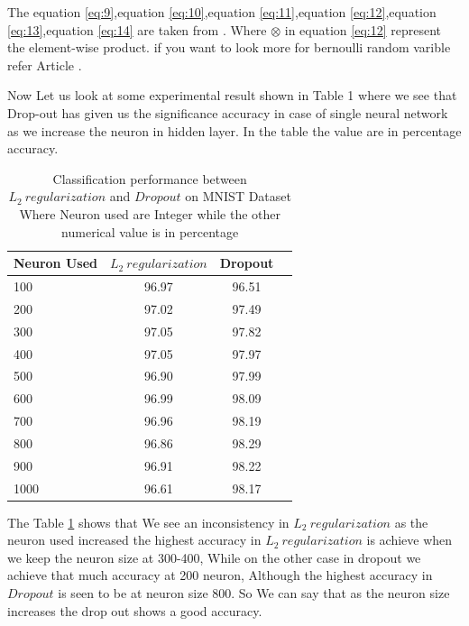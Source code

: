 \documentclass{article}
\begin{document}
\begin{multicols}{2}
The equation \ref{eq:9},equation \ref{eq:10},equation \ref{eq:11},equation \ref{eq:12},equation \ref{eq:13},equation \ref{eq:14} are taken from \cite{7877209}. Where $\otimes$ in equation \ref{eq:12} represent the element-wise product. if you want to look more for bernoulli random varible refer Article \cite{https://doi.org/10.1002/bimj.201500115}. 

Now Let us look at some experimental result shown in Table 1 where we see that Drop-out has given us the significance accuracy in case of single neural network as we increase the neuron in hidden layer. In the table the value are in percentage accuracy. 

\begin{table}[H]
    \centering
    \begin{tabular}{|p{2 cm}|c|c|c|}
    \hline
    \centering Neuron Used & 
         \centering $L_2 \ regularization$
         & Dropout \\
    \hline
    100
    &  96.97
    &  96.51 \\
    200
    &  97.02
    &  97.49 \\
    300
    &  97.05
    &  97.82 \\
    400
    &  97.05
    &  97.97 \\
    500
    &  96.90
    &  97.99 \\
    600
    &  96.99
    &  98.09 \\
    700
    &  96.96
    &  98.19 \\
    800
    &  96.86
    &  98.29 \\
    900
    &  96.91
    &  98.22 \\
    1000
    &  96.61
    &  98.17 \\
    \hline
    
    \end{tabular}
    \caption{Classification performance between $L_2 \ regularization$ and $Dropout$ on MNIST Dataset Where Neuron used are Integer while the other numerical value is in percentage\cite{7877209}}
    \label{tab:my_label}
\end{table}

The Table \ref{tab:my_label}  shows that We see an inconsistency in $L_2 \ regularization$ as the neuron used increased the highest accuracy in $L_2 \ regularization$ is achieve when we keep the neuron size at 300-400, While on the other case in dropout we achieve that much accuracy at 200 neuron, Although the highest accuracy in $Dropout$ is seen to be at neuron size 800. So We can say that as the neuron size increases the drop out shows a good accuracy. 


\end{multicols}
\end{document}
